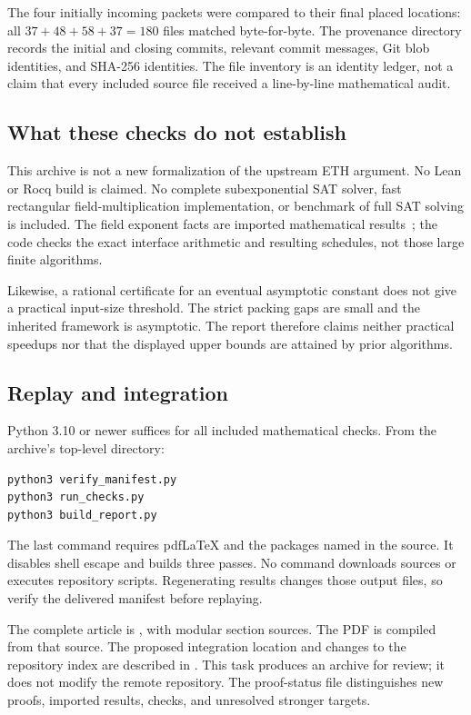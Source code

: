 The four initially incoming packets were compared to their final placed
locations: all $37+48+58+37=180$ files matched byte-for-byte.
The provenance directory records the initial and closing commits, relevant
commit messages, Git blob identities, and SHA-256 identities. The file
inventory is an identity ledger, not a claim that every included source
file received a line-by-line mathematical audit.

\subsection{What these checks do not establish}

This archive is not a new formalization of the upstream ETH argument.
No Lean or Rocq build is claimed. No complete subexponential SAT solver,
fast rectangular field-multiplication implementation, or benchmark of
full SAT solving is included. The field exponent facts are imported
mathematical results~\cite{mm}; the code checks the exact interface
arithmetic and resulting schedules, not those large finite algorithms.

Likewise, a rational certificate for an eventual asymptotic constant
does not give a practical input-size threshold. The strict packing gaps
are small and the inherited framework is asymptotic. The report therefore
claims neither practical speedups nor that the displayed upper bounds
are attained by prior algorithms.

\subsection{Replay and integration}

Python 3.10 or newer suffices for all included mathematical checks.
From the archive's top-level directory:
\begin{verbatim}
python3 verify_manifest.py
python3 run_checks.py
python3 build_report.py
\end{verbatim}
The last command requires pdfLaTeX and the packages named in the source.
It disables shell escape and builds three passes. No command downloads
sources or executes repository scripts. Regenerating results changes
those output files, so verify the delivered manifest before replaying.

The complete article is , with modular section sources.
The PDF is compiled from that source. The proposed integration location
and changes to the repository index are described in
. This task produces an archive for review; it does
not modify the remote repository. The proof-status file distinguishes
new proofs, imported results, checks, and unresolved stronger targets.
